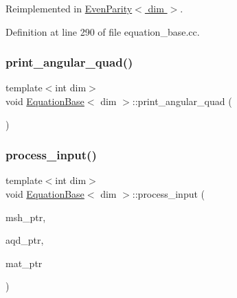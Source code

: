 Reimplemented in \hyperlink{class_even_parity_a4cc64002161193e2227e962c9ecb8cf5}{Even\+Parity$<$ dim $>$}.



Definition at line 290 of file equation\+\_\+base.\+cc.

\mbox{\label{class_equation_base_acf618369789a383d0aeebd70ddd60b9e}} 
\subsubsection{\texorpdfstring{print\+\_\+angular\+\_\+quad()}{print\_angular\_quad()}}
{\footnotesize\ttfamily template$<$int dim$>$ \\
void \hyperlink{class_equation_base}{Equation\+Base}$<$ dim $>$\+::print\+\_\+angular\+\_\+quad (\begin{DoxyParamCaption}{ }\end{DoxyParamCaption})\hspace{0.3cm}{\ttfamily [private]}}

\mbox{\label{class_equation_base_afd853e7e9fd859216a705a517235c6ba}} 
\subsubsection{\texorpdfstring{process\+\_\+input()}{process\_input()}}
{\footnotesize\ttfamily template$<$int dim$>$ \\
void \hyperlink{class_equation_base}{Equation\+Base}$<$ dim $>$\+::process\+\_\+input (\begin{DoxyParamCaption}\item[{const std\+\_\+cxx11\+::shared\+\_\+ptr$<$ \hyperlink{class_mesh_generator}{Mesh\+Generator}$<$ dim $>$ $>$}]{msh\+\_\+ptr,  }\item[{const std\+\_\+cxx11\+::shared\+\_\+ptr$<$ \hyperlink{class_a_q_base}{A\+Q\+Base}$<$ dim $>$ $>$}]{aqd\+\_\+ptr,  }\item[{const std\+\_\+cxx11\+::shared\+\_\+ptr$<$ \hyperlink{class_material_properties}{Material\+Properties} $>$}]{mat\+\_\+ptr }\end{DoxyParamCaption})\hspace{0.3cm}{\ttfamily [private]}}



